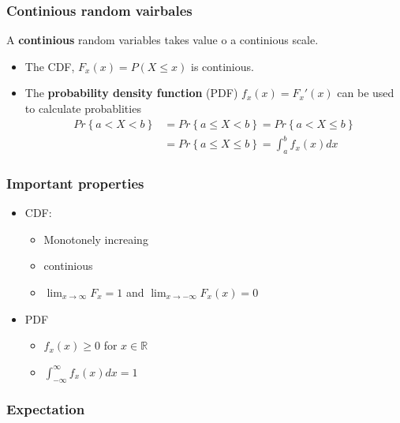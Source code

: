 \documentclass{article}
\theoremstyle{remark}
\begin{document}
\subsubsection{Continious random vairbales}%
\label{ssub:continious_random_vairbales}
 A \textbf{continious} random variables takes value o a continious scale.
 \begin{itemize}
   \item The CDF, $F_{x}\left( x \right) = P \left( X \le x \right)$ is continious.
   \item The \textbf{probability density function} (PDF) $f_{x}\left( x \right) = F_{x}' \left( x \right)$ can be used to calculate probablities \[
   \begin{split}
     Pr \left\{ a < X < b \right\} &=  Pr \left\{ a \le X < b \right\} = Pr\left\{ a < X \le b \right\} \\
     &=  Pr\left\{ a \le X \le b \right\} = \int_{a}^{b}  f_{x}\left( x \right)dx
   \end{split}
   \]
 \end{itemize}


 \subsubsection{Important properties}%
 \label{ssub:important_properties}

 \begin{itemize}
   \item CDF:
     \begin{itemize}
       \item Monotonely increaing
       \item continious
        \item $\lim_{x \to \infty} F_{x} = 1$ and $\lim_{x \to - \infty} F_{x}\left( x \right) = 0$
     \end{itemize}
   \item PDF
     \begin{itemize}
       \item $f_{x}\left( x \right) \ge 0$ for $x \in\mathbb{R} $
       \item $\int_{-\infty}^{\infty} f_{x}\left( x \right)dx = 1$
     \end{itemize}
 \end{itemize}


\subsubsection{Expectation}%
\label{ssub:expectation}
\end{document}
